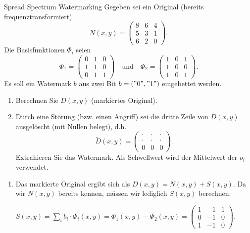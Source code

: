 \documentclass{article}
\author{Leopold Lemmermann}
\begin{document}
\createtitle

\setcounter{section}{20}
\begin{exercise}[3]{Spread Spectrum Watermarking}
  Gegeben sei ein Original (bereits frequenztransformiert)
  \[
    N(x,y)=\begin{pmatrix} 8 & 6 & 4 \\ 5 & 3 & 1\\ 6 & 2 & 0 \end{pmatrix}.
  \]
  Die Basisfunktionen $\Phi_i$ seien
  \[
    \Phi_1=\begin{pmatrix} 0 & 1 & 0 \\ 1 & 1 & 0 \\ 0 & 1 & 1 \end{pmatrix} \quad \text{und} \quad \Phi_2=\begin{pmatrix} 1 & 0 & 1 \\ 1 & 0 & 0 \\ 1 & 0 & 1 \end{pmatrix}.
  \]
  Es soll ein Watermark $b$ aus zwei Bit $b = ("0","1")$ eingebettet werden.

  \begin{enumerate}
    \item Berechnen Sie $D(x,y)$ (markiertes Original).
    \item Durch eine Störung (bzw. einen Angriff) sei die dritte Zeile von $D(x,y)$ ausgelöscht (mit Nullen belegt), d.h.
          \[
            \tilde{D}(x,y)=\begin{pmatrix} \cdot & \cdot & \cdot \\ \cdot & \cdot & \cdot \\ 0 & 0 & 0 \end{pmatrix}.
          \]
          Extrahieren Sie das Watermark. Als Schwellwert wird der Mittelwert der $o_i$ verwendet.
  \end{enumerate}

  \begin{solution}
    \begin{enumerate}
      \item Das markierte Original ergibt sich als $D(x,y) = N(x,y) + S(x,y)$. Da wir $N(x,y)$ bereits kennen, müssen wir lediglich $S(x,y)$ berechnen:

            $S(x,y) = \sum_i{b_i \cdot \Phi_i(x,y)} = \Phi_1(x,y) - \Phi_2(x,y) = \begin{pmatrix} 1 & -1 & 1 \\ 0 & -1 & 0 \\ 1 & -1 & 0 \end{pmatrix}$.


\end{enumerate}
\end{solution}
\end{exercise}
\end{document}
